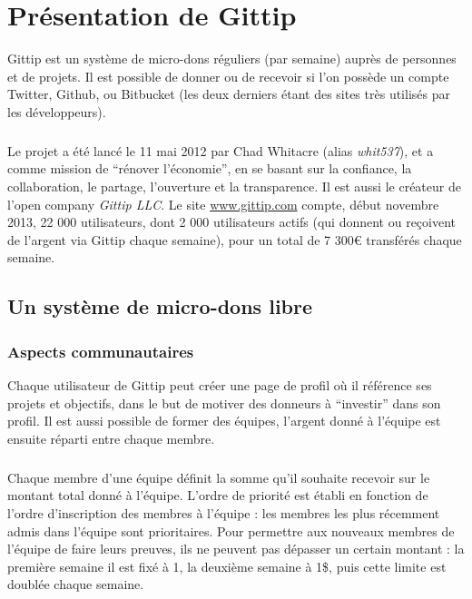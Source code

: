 \chapter{Présentation de Gittip}

Gittip est un système de micro-dons réguliers (par semaine) auprès de personnes
et de projets. Il est possible de donner ou de recevoir si l'on possède un
compte Twitter, Github, ou Bitbucket (les deux derniers étant des sites très
utilisés par les développeurs).

\paragraph{}
Le projet a été lancé le 11 mai 2012 par Chad Whitacre (alias \emph{whit537}),
et a comme mission de ``rénover l'économie'', en se basant sur la confiance, la
collaboration, le partage, l'ouverture et la transparence. Il est aussi le
créateur de l'open company \emph{Gittip LLC}. Le site \url{www.gittip.com}
compte, début novembre 2013, 22 000 utilisateurs, dont 2 000 utilisateurs
actifs (qui donnent ou reçoivent de l'argent via Gittip chaque semaine), pour
un total de 7 300\euro{} transférés chaque semaine.


    \section{Un système de micro-dons libre}

    \subsection{Aspects communautaires}

Chaque utilisateur de Gittip peut créer une page de profil où il référence ses
projets et objectifs, dans le but de motiver des donneurs à ``investir'' dans
son profil. Il est aussi possible de former des équipes, l'argent donné à
l'équipe est ensuite réparti entre chaque membre.

\paragraph{}
Chaque membre d'une équipe définit la somme qu'il souhaite recevoir sur le
montant total donné à l'équipe. L'ordre de priorité est établi en fonction de
l'ordre d'inscription des membres à l'équipe : les membres les plus récemment
admis dans l'équipe sont prioritaires. Pour permettre aux nouveaux membres de
l'équipe de faire leurs preuves, ils ne peuvent pas dépasser un certain montant
: la première semaine il est fixé à 1\textcent{}, la deuxième semaine à 1\${},
puis cette limite est doublée chaque semaine.


